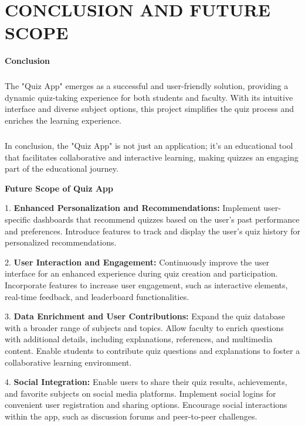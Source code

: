 \chapter{CONCLUSION AND FUTURE SCOPE}

\textbf{Conclusion}\\
\raggedright
\large{\paragraph{}
The "Quiz App" emerges as a successful and user-friendly solution, providing a dynamic quiz-taking experience for both students and faculty. With its intuitive interface and diverse subject options, this project simplifies the quiz process and enriches the learning experience.}
\large{\paragraph{}
In conclusion, the "Quiz App" is not just an application; it's an educational tool that facilitates collaborative and interactive learning, making quizzes an engaging part of the educational journey.}

\vspace{0.5cm}
\textbf{Future Scope of Quiz App}\\
\vspace{0.5cm}

\raggedright

1. \textbf{Enhanced Personalization and Recommendations:} Implement user-specific dashboards that recommend quizzes based on the user's past performance and preferences. Introduce features to track and display the user's quiz history for personalized recommendations.
\vspace{1cm}

2. \textbf{User Interaction and Engagement:} Continuously improve the user interface for an enhanced experience during quiz creation and participation. Incorporate features to increase user engagement, such as interactive elements, real-time feedback, and leaderboard functionalities.
\vspace{1cm}

3. \textbf{Data Enrichment and User Contributions:} Expand the quiz database with a broader range of subjects and topics. Allow faculty to enrich questions with additional details, including explanations, references, and multimedia content. Enable students to contribute quiz questions and explanations to foster a collaborative learning environment.
\vspace{1cm}

4. \textbf{Social Integration:} Enable users to share their quiz results, achievements, and favorite subjects on social media platforms. Implement social logins for convenient user registration and sharing options. Encourage social interactions within the app, such as discussion forums and peer-to-peer challenges.

